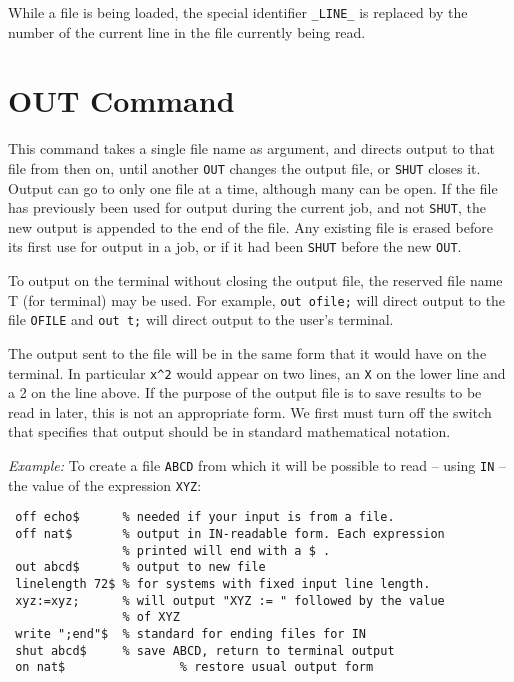 While a file is being loaded, the special identifier 
\texttt{\_LINE\_}
is replaced by the number of the current line in the file currently
being read.

\section{OUT Command}
\hypertarget{command:OUT}{}
This command takes a single file name as argument, and directs output to
that file from then on, until another \texttt{OUT} changes the output file,
or \texttt{SHUT} closes it.  Output can go to only one file at a time,
although many can be open.  If the file has previously been used for
output during the current job, and not \texttt{SHUT}, the new
output is appended to the end of the file.  Any existing file is erased
before its first use for output in a job, or if it had been \texttt{SHUT}
before the new \texttt{OUT}.

To output on the terminal without closing the output file, the reserved
file name T (for terminal) may be used.  For example,
\texttt{out ofile;} will direct output to the file \texttt{OFILE} and
\texttt{out t;} will direct output to the user's terminal.

The output sent to the file will be in the same form that it would have on
the terminal.  In particular \texttt{x\textasciicircum 2} would appear 
on two lines, an
\texttt{X} on the lower line and a 2 on the line above.  If the purpose of the
output file is to save results to be read in later, this is not an
appropriate form.  We first must turn off the  switch that
specifies that output should be in standard mathematical notation.

\textit{Example:} To create a file \texttt{ABCD} from which it will be possible
to read -- using \texttt{IN} -- the value of the expression \texttt{XYZ}:
\begin{verbatim}
 off echo$      % needed if your input is from a file.
 off nat$       % output in IN-readable form. Each expression
                % printed will end with a $ .
 out abcd$      % output to new file
 linelength 72$ % for systems with fixed input line length.
 xyz:=xyz;      % will output "XYZ := " followed by the value
                % of XYZ
 write ";end"$  % standard for ending files for IN
 shut abcd$     % save ABCD, return to terminal output
 on nat$                % restore usual output form
\end{verbatim}

